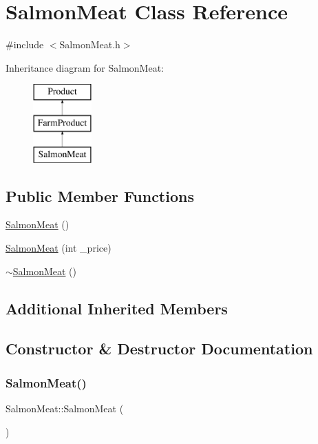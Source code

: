\hypertarget{classSalmonMeat}{}\section{Salmon\+Meat Class Reference}
\label{classSalmonMeat}


{\ttfamily \#include $<$Salmon\+Meat.\+h$>$}

Inheritance diagram for Salmon\+Meat\+:\begin{figure}[H]
\begin{center}
\leavevmode
\includegraphics[height=3.000000cm]{classSalmonMeat}
\end{center}
\end{figure}
\subsection*{Public Member Functions}
\begin{DoxyCompactItemize}
\item 
\mbox{\hyperlink{classSalmonMeat_a3e4122e73cf14b3edc21ed92c117cc9a}{Salmon\+Meat}} ()
\item 
\mbox{\hyperlink{classSalmonMeat_abe2800e9175a43d2080f06e906207c93}{Salmon\+Meat}} (int \+\_\+price)
\item 
\mbox{\hyperlink{classSalmonMeat_aeb95f128cc2f8266843f15c0b78612bd}{$\sim$\+Salmon\+Meat}} ()
\end{DoxyCompactItemize}
\subsection*{Additional Inherited Members}


\subsection{Constructor \& Destructor Documentation}
\mbox{\label{classSalmonMeat_a3e4122e73cf14b3edc21ed92c117cc9a}} 
\subsubsection{\texorpdfstring{SalmonMeat()}{SalmonMeat()}\hspace{0.1cm}{\footnotesize\ttfamily [1/2]}}
{\footnotesize\ttfamily Salmon\+Meat\+::\+Salmon\+Meat (\begin{DoxyParamCaption}{ }\end{DoxyParamCaption})}

